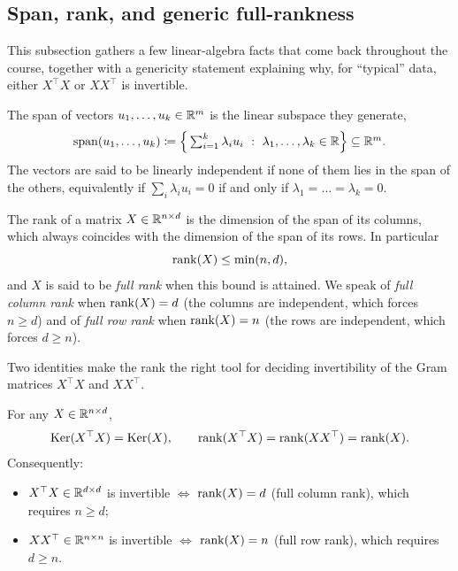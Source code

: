 \subsection{Span, rank, and generic full-rankness}
\label{subsec:cheat-rank}

This subsection gathers a few linear-algebra facts that come back throughout the course, together with a genericity statement explaining why, for ``typical'' data, either $X^\top X$ or $X X^\top$ is invertible.

\begin{definition}
The span of vectors $u_1, \dots, u_k \in \mathbb{R}^m$ is the linear subspace they generate,
\[
\operatorname{span}(u_1, \dots, u_k) \coloneqq \Big\{ \textstyle\sum_{i=1}^k \lambda_i u_i \ : \ \lambda_1, \dots, \lambda_k \in \mathbb{R} \Big\} \subseteq \mathbb{R}^m .
\]
The vectors are said to be linearly independent if none of them lies in the span of the others, equivalently if $\sum_{i} \lambda_i u_i = 0$ if and only if $\lambda_1 = \dots = \lambda_k = 0$.
\end{definition}

\begin{definition}[Rank]
The rank of a matrix $X \in \mathbb{R}^{n \times d}$ is the dimension of the span of its columns, which always coincides with the dimension of the span of its rows. In particular
\[
\operatorname{rank}(X) \leq \min(n, d),
\]
and $X$ is said to be \emph{full rank} when this bound is attained. We speak of \emph{full column rank} when $\operatorname{rank}(X) = d$ (the columns are independent, which forces $n \geq d$) and of \emph{full row rank} when $\operatorname{rank}(X) = n$ (the rows are independent, which forces $d \geq n$).
\end{definition}

Two identities make the rank the right tool for deciding invertibility of the Gram matrices $X^\top X$ and $X X^\top$.

\begin{lemma}\label{app:lemma:rank-XX-X}
For any $X \in \mathbb{R}^{n \times d}$,
\[
\mathrm{Ker}(X^\top X) = \mathrm{Ker}(X), \qquad \operatorname{rank}(X^\top X) = \operatorname{rank}(X X^\top) = \operatorname{rank}(X).
\]
Consequently:
\begin{itemize}
    \item $X^\top X \in \mathbb{R}^{d \times d}$ is invertible $\iff$ $\operatorname{rank}(X) = d$ (full column rank), which requires $n \geq d$;
    \item $X X^\top \in \mathbb{R}^{n \times n}$ is invertible $\iff$ $\operatorname{rank}(X) = n$ (full row rank), which requires $d \geq n$.
\end{itemize}
\end{lemma}

